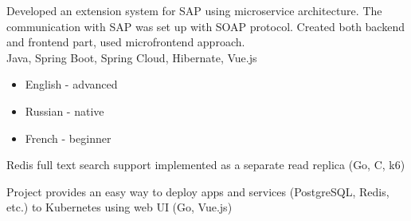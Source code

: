 \documentclass[10pt,a4paper,ragged2e,withhyper]{altacv}
\begin{document}
\begin{paracol}{2}
\divider


Developed an extension system for SAP using microservice architecture. The communication with SAP was set up with SOAP protocol. Created both backend and frontend part, used microfrontend approach.\\
Java, Spring Boot, Spring Cloud, Hibernate, Vue.js

\switchcolumn







\medskip



\medskip





\begin{itemize}
\item English - advanced
\item Russian - native
\item French - beginner
\end{itemize}



Redis full text search support implemented as a separate read replica (Go, C, k6)


\divider


Project provides an easy way to deploy apps and services (PostgreSQL, Redis, etc.) to Kubernetes using web UI (Go, Vue.js)



\end{paracol}
\end{document}
